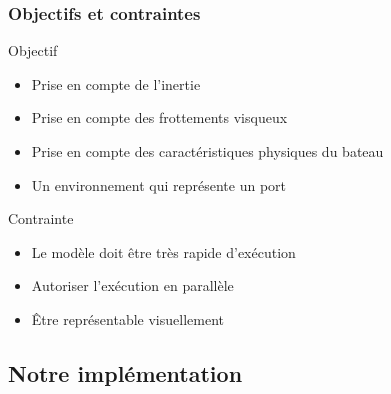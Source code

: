 \documentclass[8pt]{beamer}
\begin{document}
\begin{frame}

  \frametitle{Objectifs et contraintes}

\begin{block}{Objectif}
    \begin{itemize}
    \item Prise en compte de l'inertie
    \item Prise en compte des frottements visqueux
    \item Prise en compte des caractéristiques physiques du bateau
    \item Un environnement qui représente un port
    \end{itemize}
\end{block}

\pause

\begin{block}{Contrainte}
    \begin{itemize}
    \item Le modèle doit être très rapide d'exécution
    \item Autoriser l'exécution en parallèle
    \item Être représentable visuellement
    \end{itemize}
\end{block}

\end{frame}

\subsection{Notre implémentation}
\end{document}
